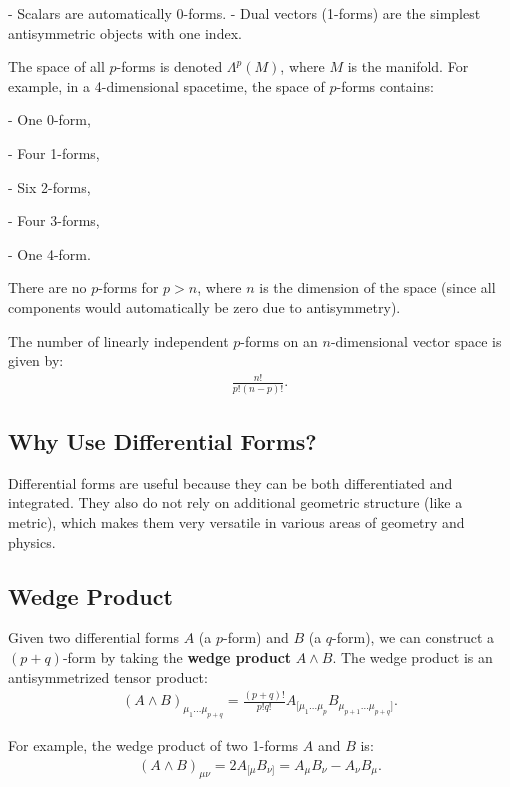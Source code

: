 \documentclass[11pt,letterpaper]{book}
\begin{document}
- Scalars are automatically 0-forms.
- Dual vectors (1-forms) are the simplest antisymmetric objects with one index.

The space of all \( p \)-forms is denoted \( \Lambda^p(M) \), where \( M \) is the manifold. For example, in a 4-dimensional spacetime, the space of \( p \)-forms contains:

- One 0-form,

- Four 1-forms,

- Six 2-forms,

- Four 3-forms,

- One 4-form.

There are no \( p \)-forms for \( p > n \), where \( n \) is the dimension of the space (since all components would automatically be zero due to antisymmetry).

The number of linearly independent \( p \)-forms on an \( n \)-dimensional vector space is given by:
\begin{align}
\frac{n!}{p!(n - p)!}.
\end{align}

\subsection{Why Use Differential Forms?}
Differential forms are useful because they can be both differentiated and integrated. They also do not rely on additional geometric structure (like a metric), which makes them very versatile in various areas of geometry and physics.

\subsection{Wedge Product}

Given two differential forms \( A \) (a \( p \)-form) and \( B \) (a \( q \)-form), we can construct a \( (p + q) \)-form by taking the \textbf{wedge product} \( A \wedge B \). The wedge product is an antisymmetrized tensor product:
\begin{align}
(A \wedge B)_{\mu_1 \dots \mu_{p+q}} = \frac{(p + q)!}{p! q!} A_{[\mu_1 \dots \mu_p} B_{\mu_{p+1} \dots \mu_{p+q}]}.
\end{align}


For example, the wedge product of two 1-forms \( A \) and \( B \) is:
\begin{align}
(A \wedge B)_{\mu\nu} = 2 A_{[\mu} B_{\nu]} = A_\mu B_\nu - A_\nu B_\mu.
\end{align}
\end{document}
